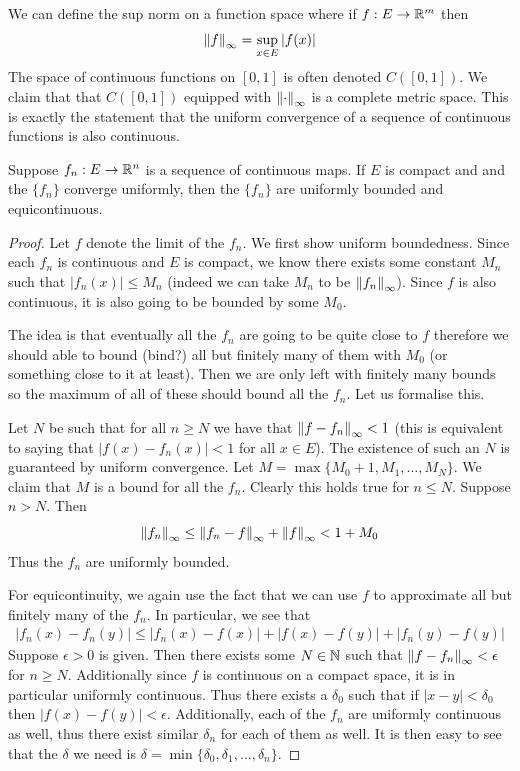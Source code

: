 We can define the sup norm on a function space where if $f: E \to \mathbb{R}^m$ then
$$ \left\lVert f\right\rVert_\infty = \sup_{x \in E} |f(x)| $$
The space of continuous functions on $[0, 1]$ is often denoted $C([0, 1])$. We claim that that $C([0, 1])$ equipped with $\left\lVert\cdot\right\rVert_{\infty}$ is a complete metric space. This is exactly the statement that the uniform convergence of a sequence of continuous functions is also continuous.

\begin{theorem}
    Suppose $f_n: E \to \mathbb{R}^n$  is a sequence of continuous maps. If $E$ is compact and and the $\{f_n\}$ converge uniformly, then the $\{f_n\}$ are uniformly bounded and equicontinuous.
\end{theorem}
\begin{proof}
Let $f$ denote the limit of the $f_n$. We first show uniform boundedness. Since each $f_n$ is continuous and $E$ is compact, we know there exists some constant $M_n$ such that $|f_n(x)| \leq M_n$ (indeed we can take $M_n$ to be $\left\lVert f_n\right\rVert_{\infty}$). Since $f$ is also continuous, it is also going to be bounded by some $M_0$.

The idea is that eventually all the $f_n$ are going to be quite close to $f$ therefore we should able to bound (bind?) all but finitely many of them with $M_0$ (or something close to it at least). Then we are only left with finitely many bounds so the maximum of all of these should bound all the $f_n$. Let us formalise this.

Let $N$ be such that for all $n \geq N$ we have that $\left\lVert f - f_n\right\rVert_{\infty} < 1$ (this is equivalent to saying that $|f(x) - f_n(x)| < 1$ for all $x \in E$). The existence of such an $N$ is guaranteed by uniform convergence. Let $M = \max\{M_0 + 1, M_1, \dots, M_{N}\}$. We claim that $M$ is a bound for all the $f_n$. Clearly this holds true for $n \leq N$. Suppose $n > N$. Then
$$ \left\lVert f_n\right\rVert_{\infty} \leq \left\lVert f_n - f\right\rVert_{\infty} + \left\lVert f\right\rVert_{\infty} < 1 + M_0 $$
Thus the $f_n$ are uniformly bounded.

For equicontinuity, we again use the fact that we can use $f$ to approximate all but finitely many of the $f_n$. In particular, we see that
\begin{align*}
    |f_n(x) - f_n(y)| \leq |f_n(x) - f(x)| + |f(x) - f(y)| + |f_n(y) - f(y)|
\end{align*}
Suppose $\epsilon > 0$ is given. Then there exists some $N \in \mathbb{N}$ such that $\left\lVert f - f_n\right\rVert_{\infty} < \epsilon$ for $n \geq N$. Additionally since $f$ is continuous on a compact space, it is in particular uniformly continuous. Thus there exists a $\delta_0$ such that if $|x - y| < \delta_0$ then $|f(x) - f(y)| < \epsilon$. Additionally, each of the $f_n$ are uniformly continuous as well, thus there exist similar $\delta_n$ for each of them as well. It is then easy to see that the $\delta$ we need is $\delta = \min\{\delta_0, \delta_1, \dots, \delta_n\}$.
\end{proof}

